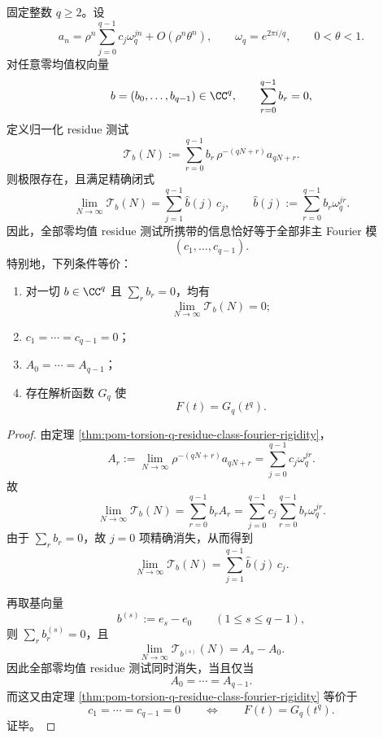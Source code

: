 \begin{theorem}\label{thm:conclusion-zero-mean-residue-tests-complete-detection}
固定整数 \(q\ge 2\)。设
\[
a_n=\rho^n\sum_{j=0}^{q-1}c_j\omega_q^{jn}+O(\rho^n\theta^n),
\qquad
\omega_q=e^{2\pi i/q},
\qquad
0<\theta<1.
\]
对任意零均值权向量
\[
b=(b_0,\dots,b_{q-1})\in \CC^q,
\qquad
\sum_{r=0}^{q-1}b_r=0,
\]
定义归一化 residue 测试
\[
\mathcal T_b(N):=\sum_{r=0}^{q-1}b_r\,\rho^{-(qN+r)}a_{qN+r}.
\]
则极限存在，且满足精确闭式
\[
\lim_{N\to\infty}\mathcal T_b(N)
=
\sum_{j=1}^{q-1}\widehat b(j)\,c_j,
\qquad
\widehat b(j):=\sum_{r=0}^{q-1}b_r\omega_q^{jr}.
\]
因此，全部零均值 residue 测试所携带的信息恰好等于全部非主 Fourier 模
\[
(c_1,\dots,c_{q-1}).
\]
特别地，下列条件等价：
\begin{enumerate}
\normalfont
  \item 对一切 \(b\in \CC^q\) 且 \(\sum_r b_r=0\)，均有
  \[
  \lim_{N\to\infty}\mathcal T_b(N)=0;
  \]
  \item \(c_1=\cdots=c_{q-1}=0\)；
  \item \(A_0=\cdots=A_{q-1}\)；
  \item 存在解析函数 \(G_q\) 使
  \[
  F(t)=G_q(t^q).
  \]
\end{enumerate}
\end{theorem}
\begin{proof}
由定理 \ref{thm:pom-torsion-q-residue-class-fourier-rigidity}，
\[
A_r:=\lim_{N\to\infty}\rho^{-(qN+r)}a_{qN+r}
=
\sum_{j=0}^{q-1}c_j\omega_q^{jr}.
\]
故
\[
\lim_{N\to\infty}\mathcal T_b(N)
=
\sum_{r=0}^{q-1}b_rA_r
=
\sum_{j=0}^{q-1}c_j\sum_{r=0}^{q-1}b_r\omega_q^{jr}.
\]
由于 \(\sum_r b_r=0\)，故 \(j=0\) 项精确消失，从而得到
\[
\lim_{N\to\infty}\mathcal T_b(N)
=
\sum_{j=1}^{q-1}\widehat b(j)\,c_j.
\]

再取基向量
\[
b^{(s)}:=e_s-e_0
\qquad
(1\le s\le q-1),
\]
则 \(\sum_r b^{(s)}_r=0\)，且
\[
\lim_{N\to\infty}\mathcal T_{b^{(s)}}(N)=A_s-A_0.
\]
因此全部零均值 residue 测试同时消失，当且仅当
\[
A_0=\cdots=A_{q-1}.
\]
而这又由定理 \ref{thm:pom-torsion-q-residue-class-fourier-rigidity} 等价于
\[
c_1=\cdots=c_{q-1}=0
\qquad\Longleftrightarrow\qquad
F(t)=G_q(t^q).
\]
证毕。
\end{proof}

